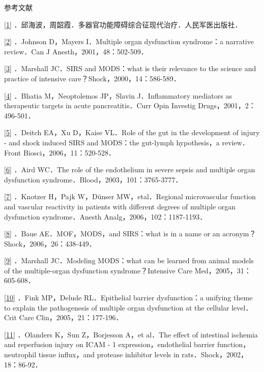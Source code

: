 参考文献

\protect\hyperlink{text00007.htmlux5cux23ch1-6-back}{{[}1{]}}
．邱海波，周韶霞．多器官功能障碍综合征现代治疗．人民军医出版社．

\protect\hyperlink{text00007.htmlux5cux23ch2-6-back}{{[}2{]}} ．Johnson
D，Mayers I．Multiple organ dysfunction syndrome：a narrative
review．Can J Anesth，2001，48：502-509．

\protect\hyperlink{text00007.htmlux5cux23ch3-6-back}{{[}3{]}} ．Marshall
JC．SIRS and MODS：what is their relevance to the science and practice
of intensive care？Shock，2000，14：586-589．

\protect\hyperlink{text00007.htmlux5cux23ch4-6-back}{{[}4{]}} ．Bhatia
M，Neoptolemos JP，Slavin J．Inflammatory mediators as therapeutic
targets in acute pancreatitis．Curr Opin Investig
Drugs，2001，2：496-501．

\protect\hyperlink{text00007.htmlux5cux23ch5-6-back}{{[}5{]}} ．Deitch
EA，Xu D，Kaise VL．Role of the gut in the development of injury - and
shock induced SIRS and MODS：the gut-lymph hypothesis，a review．Front
Biosci，2006，11：520-528．

\protect\hyperlink{text00007.htmlux5cux23ch6-6-back}{{[}6{]}} ．Aird
WC．The role of the endothelium in severe sepsis and multiple organ
dysfunction syndrome．Blood，2003，101：3765-3777．

\protect\hyperlink{text00007.htmlux5cux23ch7-6-back}{{[}7{]}} ．Knotzer
H，Pajk W，Dünser MW，etal．Regional microvascular function and vascular
reactivity in patients with different degrees of multiple organ
dysfunction syndrome．Anesth Analg，2006，102：1187-1193．

\protect\hyperlink{text00007.htmlux5cux23ch8-6-back}{{[}8{]}} ．Baue
AE．MOF，MODS，and SIRS：what is in a name or an
acronym？Shock，2006，26：438-449．

\protect\hyperlink{text00007.htmlux5cux23ch9-6-back}{{[}9{]}} ．Marshall
JC．Modeling MODS：what can be learned from animal models of the
multiple-organ dysfunction syndrome？Intensive Care
Med，2005，31：605-608．

\protect\hyperlink{text00007.htmlux5cux23ch10-6-back}{{[}10{]}} ．Fink
MP，Delude RL．Epithelial barrier dysfunction：a unifying theme to
explain the pathogenesis of multiple organ dysfunction at the cellular
level．Crit Care Clin，2005，21：177-196．

\protect\hyperlink{text00007.htmlux5cux23ch11-6-back}{{[}11{]}}
．Olanders K，Sun Z，Borjesson A，et al．The effect of intestinal
ischemia and reperfusion injury on ICAM - 1 expression，endothelial
barrier function，neutrophil tissue influx，and protease inhibitor
levels in rats．Shock，2002，18：86-92．

